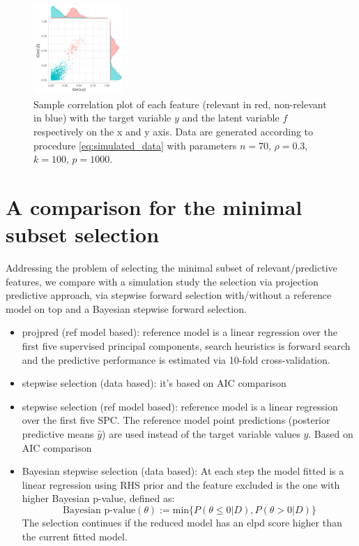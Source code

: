 \documentclass[american,]{article}
\theoremstyle{definition}
\begin{document}
\begin{figure}[tp]
  \centering
  \includegraphics[width=0.3\textwidth]{graphics/correlation.pdf}
  \caption{Sample correlation plot of each feature (relevant in red, 
  non-relevant in blue) with the target variable $y$ and the latent variable 
  $f$ respectively on the x and y axis. Data are generated according to 
  procedure \eqref{eq:simulated_data} with parameters $n=70$, $\rho=0.3$,
  $k=100$, $p=1000$.\\}
  \label{fig:correlation}
\end{figure}

\hypertarget{comparison-minimal-subset}{
\section{A comparison for the minimal subset selection}\label{comparison-minimal-subset}}

Addressing the problem of selecting the minimal subset of relevant/predictive features, 
we compare with a simulation study the selection via projection predictive approach, 
via stepwise forward selection with/without a reference model on top and a Bayesian 
stepwise forward selection.
\begin{itemize}
\item projpred (ref model based): reference model is a linear regression over the first 
five supervised principal components, search heuristics is forward search and the predictive 
performance is estimated via 10-fold cross-validation.
\item stepwise selection (data based): it's based on AIC comparison
\item stepwise selection (ref model based): reference model is a linear regression 
over the first five SPC. The reference model point predictions (posterior predictive means $\hat{y}$) 
are used instead of the target variable values $y$. Based on AIC comparison
\item Bayesian stepwise selection (data based): At each step the model fitted is a 
linear regression using RHS prior and the feature excluded is the one with higher 
Bayesian p-value, defined as:
\begin{equation}
\text{Bayesian p-value}(\theta) := \text{min}\{P(\theta\leq0|D),P(\theta>0|D)\}
\end{equation}
The selection continues if the reduced model has an elpd score higher than the
current fitted model.
\end{itemize}
\end{document}
